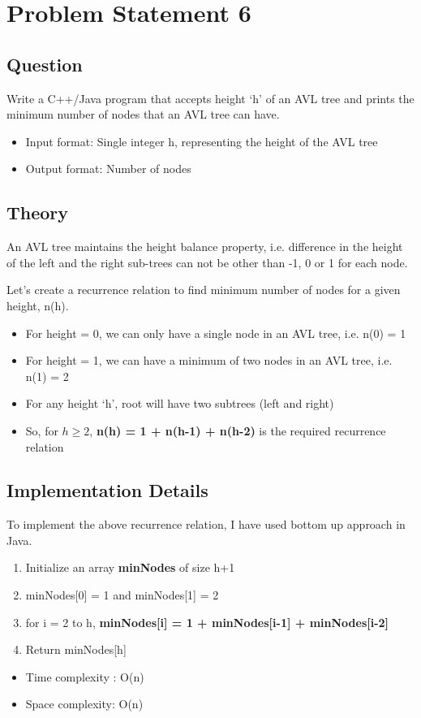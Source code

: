 \documentclass[11pt,a4paper]{article}
\begin{document}
\clearpage

\section{Problem Statement 6}\label{sec:problem6}
\subsection{Question}\label{sec:question6}
Write a C++/Java program that accepts height ‘h’ of an AVL tree and prints the minimum number of nodes that an AVL tree can have.
\begin{itemize}
    \item Input format: Single integer h, representing the height of the AVL tree
    \item Output format: Number of nodes
\end{itemize}

\subsection{Theory}\label{sec:theory6}
An AVL tree maintains the height balance property, i.e. difference in the height of the left and the right sub-trees can not be other than -1, 0 or 1 for each node.

Let's create a recurrence relation to find minimum number of nodes for a given height, n(h).

\begin{itemize}
  \item For height = 0, we can only have a single node in an AVL tree, i.e. n(0) = 1
  \item For height = 1, we can have a minimum of two nodes in an AVL tree, i.e. n(1) = 2
  \item For any height ‘h’, root will have two subtrees (left and right)
  \item So, for $h \geq 2 $, \textbf { n(h) = 1 + n(h-1) + n(h-2) } is the required recurrence relation
  
\end{itemize}
\subsection{Implementation Details}\label{sec:details6}
To implement the above recurrence relation, I have used bottom up approach in Java.
\begin{enumerate}
  \item Initialize an array \textbf{minNodes} of size h+1
  \item minNodes[0] = 1 and minNodes[1] = 2
  \item for i = 2 to h, \textbf{minNodes[i] = 1 + minNodes[i-1] + minNodes[i-2]}
  \item Return minNodes[h]
\end{enumerate}
\begin{itemize}
    \item Time complexity : O(n)
     \item Space complexity: O(n)
\end{itemize}
\end{document}
